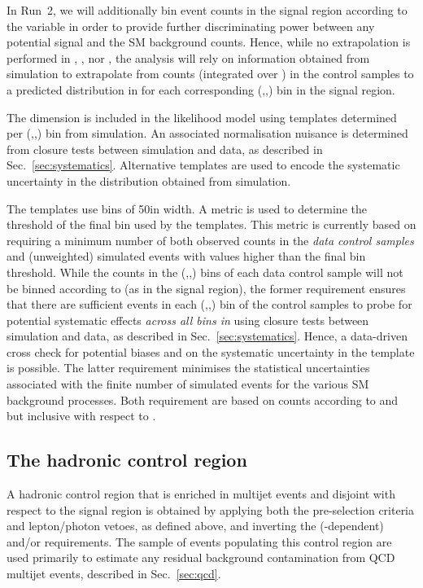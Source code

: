 In Run~2, we will additionally bin event counts in the signal region
according to the variable \mht in order to provide further
discriminating power between any potential signal and the SM
background counts. Hence, while no extrapolation is performed in
\njet, \nb, nor \HT, the analysis will rely on information obtained
from simulation to extrapolate from counts (integrated over \mht) in
the control samples to a predicted distribution in \mht for each
corresponding (\njet,\nb,\HT) bin in the signal region.

The \mht dimension is included in the likelihood model using templates
determined per (\njet,\nb,\HT) bin from simulation. An associated
normalisation nuisance is determined from closure tests between
simulation and data, as described in
Sec.~\ref{sec:systematics}. Alternative templates are used to encode
the systematic uncertainty in the \mht distribution obtained from
simulation. 

The templates use \mht bins of 50\gev in width. A metric is used to
determine the threshold of the final \mht bin used by the
templates. This metric is currently based on requiring a minimum
number of both observed counts in the {\it data control samples} and
(unweighted) simulated events with \mht values higher than the final
bin threshold. While the counts in the (\njet,\nb,\HT) bins of each
data control sample will not be binned according to \mht (as in the
signal region), the former requirement ensures that there are
sufficient events in each (\njet,\nb,\HT) bin of the control samples
to probe for potential systematic effects {\it across all bins in
  \mht} using closure tests between simulation and data, as described
in Sec.~\ref{sec:systematics}. Hence, a data-driven cross check for
potential biases and on the systematic uncertainty in the \mht
template is possible. The latter requirement minimises the statistical
uncertainties associated with the finite number of simulated events
for the various SM background processes. Both requirement are based on
counts according to \njet and \nb but inclusive with respect to \nb.

\subsection{The hadronic control region}

A hadronic control region that is enriched in multijet events and
disjoint with respect to the signal region is obtained by applying
both the pre-selection criteria and lepton/photon vetoes, as defined
above, and inverting the (\HT-dependent) \alphat and/or \mhtmet
requirements. 
The sample of events populating this control region are used primarily
to estimate any residual background contamination from QCD multijet
events, described in Sec.~\ref{sec:qcd}.

